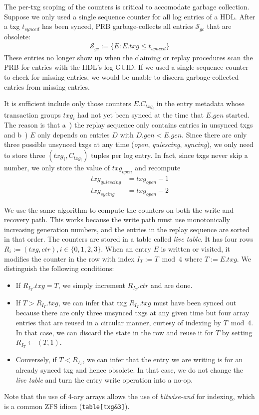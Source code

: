 \documentclass[12pt,a4paper,twoside]{book}
\begin{document}
The per-txg scoping of the counters is critical to accomodate garbage collection.
Suppose we only used a single sequence counter for all log entries of a HDL.
After a txg $t_{synced}$ has been synced, PRB garbage-collects all entries $\mathcal{S}_{gc}$ that are obsolete:
\begin{align*}
    \mathcal{S}_{gc} := \{ E : E.txg \le t_{synced}\}
\end{align*}
These entries no longer show up when the claiming or replay procedures scan the PRB for entries with the HDL's log GUID.
If we used a single sequence counter to check for missing entries, we would be unable to discern garbage-collected entries from missing entries.

It is sufficient include only those counters $E.C_{txg_i}$ in the entry metadata whose transaction groups $txg_i$ had not yet been synced at the time that $E.gen$ started.
The reason is that a~) the replay sequence only contains entries in unsynced txgs and b~) $E$ only depends on entries $D$ with $D.gen < E.gen$.
Since there are only three possible unsynced txgs at any time (\textit{open}, \textit{quiescing}, \textit{syncing}), we only need to store three $(txg_i, C_{txg_i})$ tuples per log entry.
In fact, since txgs never skip a number, we only store the value of $txg_{open}$ and recompute
\begin{align*}
    txg_{quiescing} & = txg_{open} - 1 \\
    txg_{sycing} & = txg_{open} - 2
\end{align*}

We use the same algorithm to compute the counters on both the write and recovery path.
This works because the write path must use monotonically increasing generation numbers, and the entries in the replay sequence are sorted in that order.
The counters are stored in a table called \textit{live table}.
It has four rows $R_i := (txg, ctr), i \in \{0,1,2,3\}$.
When an entry $E$ is written or visited, it modifies the counter in the row with index $I_T := T \bmod 4$ where $T := E.txg$.
We distinguish the following conditions:
\begin{itemize}[noitemsep]
\item If $R_{I_T}.txg = T$, we simply increment $R_{I_T}.ctr$ and are done.
\item If $T > R_{I_T}.txg$, we can infer that txg $R_{I_T}.txg$ must have been synced out because there are only three unsynced txgs at any given time but four array entries that are reused in a circular manner, curtesy of indexing by $T \bmod 4$.
In that case, we can discard the state in the row and reuse it for $T$ by setting $R_{I_T} \leftarrow (T, 1)$.
\item Conversely, if $T < R_{I_T}$, we can infer that the entry we are writing is for an already synced txg and hence obsolete.
In that case, we do not change the \textit{live table} and turn the entry write operation into a no-op.
\end{itemize}
Note that the use of 4-ary arrays allows the use of \textit{bitwise-and} for indexing, which is a common ZFS idiom (\lstinline{table[txg&3]}).
\end{document}
